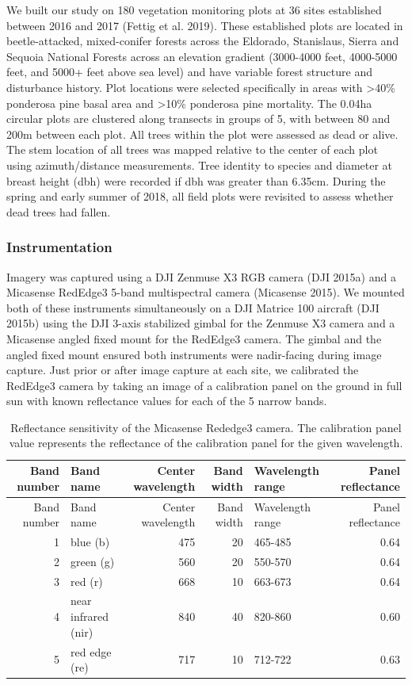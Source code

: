 \documentclass[]{article}
\begin{document}
We built our study on 180 vegetation monitoring plots at 36 sites
established between 2016 and 2017 (Fettig et al. 2019). These
established plots are located in beetle-attacked, mixed-conifer forests
across the Eldorado, Stanislaus, Sierra and Sequoia National Forests
across an elevation gradient (3000-4000 feet, 4000-5000 feet, and 5000+
feet above sea level) and have variable forest structure and disturbance
history. Plot locations were selected specifically in areas with
\textgreater{}40\% ponderosa pine basal area and \textgreater{}10\%
ponderosa pine mortality. The 0.04ha circular plots are clustered along
transects in groups of 5, with between 80 and 200m between each plot.
All trees within the plot were assessed as dead or alive. The stem
location of all trees was mapped relative to the center of each plot
using azimuth/distance measurements. Tree identity to species and
diameter at breast height (dbh) were recorded if dbh was greater than
6.35cm. During the spring and early summer of 2018, all field plots were
revisited to assess whether dead trees had fallen.

\subsubsection{Instrumentation}\label{instrumentation}

Imagery was captured using a DJI Zenmuse X3 RGB camera (DJI 2015a) and a
Micasense RedEdge3 5-band multispectral camera (Micasense 2015). We
mounted both of these instruments simultaneously on a DJI Matrice 100
aircraft (DJI 2015b) using the DJI 3-axis stabilized gimbal for the
Zenmuse X3 camera and a Micasense angled fixed mount for the RedEdge3
camera. The gimbal and the angled fixed mount ensured both instruments
were nadir-facing during image capture. Just prior or after image
capture at each site, we calibrated the RedEdge3 camera by taking an
image of a calibration panel on the ground in full sun with known
reflectance values for each of the 5 narrow bands.

\begin{longtable}[]{@{}rlrrlr@{}}
\caption{Reflectance sensitivity of the Micasense Rededge3 camera. The
calibration panel value represents the reflectance of the calibration
panel for the given wavelength.}\tabularnewline
\toprule
Band number & Band name & Center wavelength & Band width & Wavelength
range & Panel reflectance\tabularnewline
\midrule
\endfirsthead
\toprule
Band number & Band name & Center wavelength & Band width & Wavelength
range & Panel reflectance\tabularnewline
\midrule
\endhead
1 & blue (b) & 475 & 20 & 465-485 & 0.64\tabularnewline
2 & green (g) & 560 & 20 & 550-570 & 0.64\tabularnewline
3 & red (r) & 668 & 10 & 663-673 & 0.64\tabularnewline
4 & near infrared (nir) & 840 & 40 & 820-860 & 0.60\tabularnewline
5 & red edge (re) & 717 & 10 & 712-722 & 0.63\tabularnewline
\bottomrule
\end{longtable}
\end{document}
